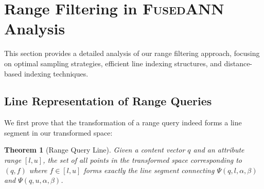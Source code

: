 \documentclass[numbers,sort]{article}
\newtheorem{theorem}{Theorem}
\begin{document}
\section{Range Filtering in \textsc{FusedANN} Analysis}
\label{sec:supp-range-filtering}

This section provides a detailed analysis of our range filtering approach, focusing on optimal sampling strategies, efficient line indexing structures, and distance-based indexing techniques.

\subsection{Line Representation of Range Queries}
\label{sec:line-rep}

We first prove that the transformation of a range query indeed forms a line segment in our transformed space:

\begin{theorem}[Range Query Line]
\label{thm:range-line}
Given a content vector $q$ and an attribute range $[l, u]$, the set of all points in the transformed space corresponding to $(q, f)$ where $f \in [l, u]$ forms exactly the line segment connecting $\Psi(q, l, \alpha, \beta)$ and $\Psi(q, u, \alpha, \beta)$.
\end{theorem}
\end{document}
